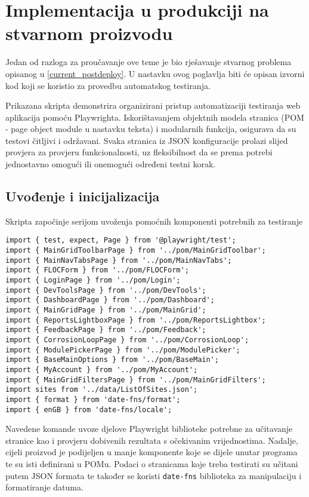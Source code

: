 \chapter{Implementacija u produkciji na stvarnom proizvodu}\label{ch:implementacija}

Jedan od razloga za proučavanje ove teme je bio rješavanje stvarnog problema opisanog u \ref{current_postdeploy}.
U nastavku ovog poglavlja biti će opisan izvorni kod koji se koristio za provedbu automatskog testiranja.

Prikazana skripta demonstrira organizirani pristup automatizaciji testiranja web aplikacija pomoću Playwrighta. Iskorištavanjem objektnih modela stranica (POM - page object module u nastavku teksta) i modularnih funkcija, osigurava da su testovi čitljivi i održavani. Svaka stranica iz JSON konfiguracije prolazi slijed provjera za provjeru funkcionalnosti, uz fleksibilnost da se prema potrebi jednostavno omogući ili onemogući određeni testni korak.

\section{Uvođenje i inicijalizacija}
Skripta započinje serijom uvoženja pomoćnih komponenti potrebnih za testiranje
\begin{verbatim}
import { test, expect, Page } from '@playwright/test';
import { MainGridToolbarPage } from '../pom/MainGridToolbar';
import { MainNavTabsPage } from '../pom/MainNavTabs';
import { FLOCForm } from '../pom/FLOCForm';
import { LoginPage } from '../pom/Login';
import { DevToolsPage } from '../pom/DevTools';
import { DashboardPage } from '../pom/Dashboard';
import { MainGridPage } from '../pom/MainGrid';
import { ReportsLightboxPage } from '../pom/ReportsLightbox';
import { FeedbackPage } from '../pom/Feedback';
import { CorrosionLoopPage } from '../pom/CorrosionLoop';
import { ModulePickerPage } from '../pom/ModulePicker';
import { BaseMainOptions } from '../pom/BaseMain';
import { MyAccount } from '../pom/MyAccount';
import { MainGridFiltersPage } from '../pom/MainGridFilters';
import sites from '../data/ListOfSites.json';
import { format } from 'date-fns/format';
import { enGB } from 'date-fns/locale';
\end{verbatim}

Navedene komande uvoze djelove Playwright biblioteke potrebne za učitavanje stranice kao i provjeru dobivenih rezultata s očekivanim vrijednostima.
Nadalje, cijeli proizvod je podijeljen u manje komponente koje se dijele unutar programa te su isti definirani u POMu.
Podaci o stranicama koje treba testirati su učitani putem JSON formata te također se koristi \texttt{date-fns} biblioteka za manipulaciju i formatiranje datuma.

